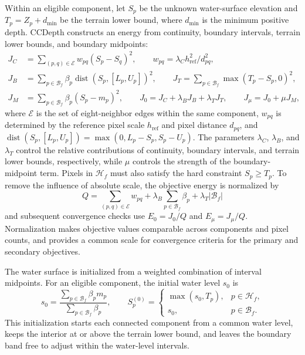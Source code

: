 \documentclass[authoryear,preprint,12pt]{elsarticle}
\begin{document}
Within an eligible component, let \(S_p\) be the unknown water-surface elevation and \(T_p=Z_p+d_{\min}\) be the terrain lower bound, where \(d_{\min}\) is the minimum positive depth. CCDepth constructs an energy from continuity, boundary intervals, terrain lower bounds, and boundary midpoints:
\begin{equation}\label{eq:ccdepth_energy}
 \begin{aligned}
 J_C&=\sum_{(p,q)\in\mathcal E}w_{pq}(S_p-S_q)^2,\qquad w_{pq}=\lambda_C h_{\mathrm{ref}}^2/d_{pq}^2,\\
 J_B&=\sum_{p\in\mathcal B_f}\beta_p\operatorname{dist}(S_p,[L_p,U_p])^2,\qquad
 J_T=\sum_{p\in\mathcal B_f}\max(T_p-S_p,0)^2,\\
 J_M&=\sum_{p\in\mathcal B_f}\beta_p(S_p-m_p)^2,\qquad
 J_0=J_C+\lambda_B J_B+\lambda_T J_T,\qquad J_\mu=J_0+\mu J_M,
 \end{aligned}
\end{equation}
where \(\mathcal E\) is the set of eight-neighbor edges within the same component, \(w_{pq}\) is determined by the reference pixel scale \(h_{\mathrm{ref}}\) and pixel distance \(d_{pq}\), and \(\operatorname{dist}(S_p,[L_p,U_p])=\max(0,L_p-S_p,S_p-U_p)\). The parameters \(\lambda_C\), \(\lambda_B\), and \(\lambda_T\) control the relative contributions of continuity, boundary intervals, and terrain lower bounds, respectively, while \(\mu\) controls the strength of the boundary-midpoint term. Pixels in \(\mathcal H_f\) must also satisfy the hard constraint \(S_p\geq T_p\). To remove the influence of absolute scale, the objective energy is normalized by
\begin{equation}\label{eq:ccdepth_normalized_energy}
 Q=\sum_{(p,q)\in\mathcal E}w_{pq}+\lambda_B\sum_{p\in\mathcal B_f}\beta_p+\lambda_T|\mathcal B_f|
\end{equation}
and subsequent convergence checks use \(E_0=J_0/Q\) and \(E_\mu=J_\mu/Q\). Normalization makes objective values comparable across components and pixel counts, and provides a common scale for convergence criteria for the primary and secondary objectives.

The water surface is initialized from a weighted combination of interval midpoints. For an eligible component, the initial water level \(s_0\) is
\begin{equation}\label{eq:ccdepth_initialization}
 s_0=\frac{\sum_{p\in\mathcal B_f}\beta_p m_p}{\sum_{p\in\mathcal B_f}\beta_p},\qquad
 S_p^{(0)}=
 \begin{cases}
  \max(s_0,T_p), & p\in\mathcal H_f,\\
  s_0, & p\in\mathcal B_f.
 \end{cases}
\end{equation}
This initialization starts each connected component from a common water level, keeps the interior at or above the terrain lower bound, and leaves the boundary band free to adjust within the water-level intervals.
\end{document}
